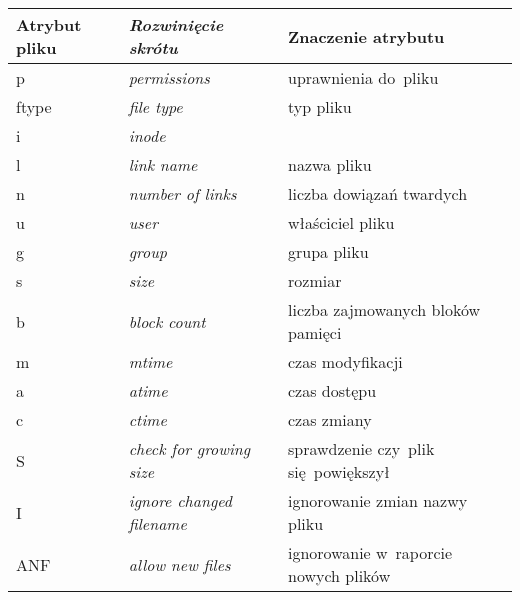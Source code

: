 \documentclass[thesis]{subfiles}
\begin{document}
\begin{table}
	\centering
	\footnotesize
	\begin{tabular}{>{\ttfamily}l|>{\itshape}l|l}
		\textnormal{Atrybut pliku} & \textnormal{Rozwinięcie skrótu}        & Znaczenie atrybutu                      \\\hline\hline
		p                          & permissions                            & uprawnienia do~pliku                    \\\hline
		ftype                      & file type                              & typ pliku                               \\\hline
		i                          & inode                                  & \inodewiki                              \\\hline
		l                          & link name                              & nazwa pliku                             \\\hline
		n                          & number of links                        & liczba dowiązań twardych                \\\hline
		u                          & user                                   & właściciel pliku                        \\\hline
		g                          & group                                  & grupa pliku                             \\\hline
		s                          & size                                   & rozmiar                                 \\\hline
		b                          & block count                            & liczba zajmowanych bloków pamięci       \\\hline
		m                          & mtime                                  & czas modyfikacji                        \\\hline
		a                          & atime                                  & czas dostępu                            \\\hline
		c                          & ctime                                  & czas zmiany                             \\\hline
		S                          & check for growing size                 & sprawdzenie czy~plik się~powiększył     \\\hline
		I                          & ignore changed filename                & ignorowanie zmian nazwy pliku           \\\hline
		ANF                        & allow new files                        & ignorowanie w~raporcie nowych plików    \\\hline

\end{tabular}
\end{table}
\end{document}
